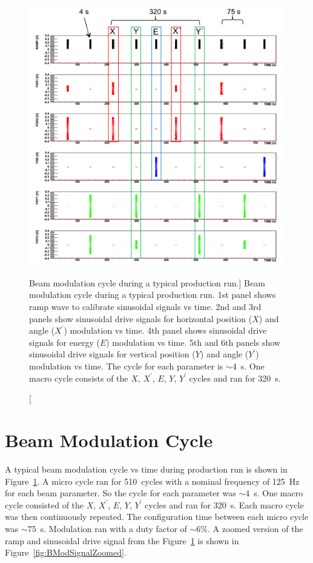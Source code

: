 \begin{singlespace}
\begin{figure}[!h]
	\begin{center}
	\includegraphics[width=15.0cm]{figures/BModCycle}
	\end{center}
	\caption
	[Beam modulation cycle during a typical production run.]
	{Beam modulation cycle during a typical production run. 1st panel shows ramp wave to calibrate sinusoidal signals vs time. 2nd and 3rd panels show sinusoidal drive signals for horizontal position ($X$) and angle ($X^{\prime}$) modulation vs time. 4th panel shows sinusoidal drive signals for energy ($E$) modulation vs time. 5th and 6th panels show sinusoidal drive signals for vertical position ($Y$) and angle ($Y^{\prime}$) modulation vs time. The cycle for each parameter is $\sim$4~s. One macro cycle consists of the $X$, $X^{\prime}$, $E$, $Y$, $Y^{\prime}$ cycles and ran for 320~s.}
	\label{fig:BModCycle}
\end{figure}
\end{singlespace}

\section{Beam Modulation Cycle}
\label{Beam Modulation Cycle}
A typical beam modulation cycle vs time during production run is shown in Figure~\ref{fig:BModCycle}. A micro cycle ran for 510~cycles with a nominal frequency of 125~Hz for each beam parameter. So the cycle for each parameter was $\sim$4~s. One macro cycle consisted of the $X$, $X^{\prime}$, $E$, $Y$, $Y^{\prime}$ cycles and ran for 320~s. Each macro cycle was then continuously repeated. The configuration time between each micro cycle was $\sim$75~s. Modulation ran with a duty factor of $\sim$6\%.
A zoomed version of the ramp and sinusoidal drive signal from the Figure~\ref{fig:BModCycle} is shown in Figure~\ref{fig:BModSignalZoomed}.

